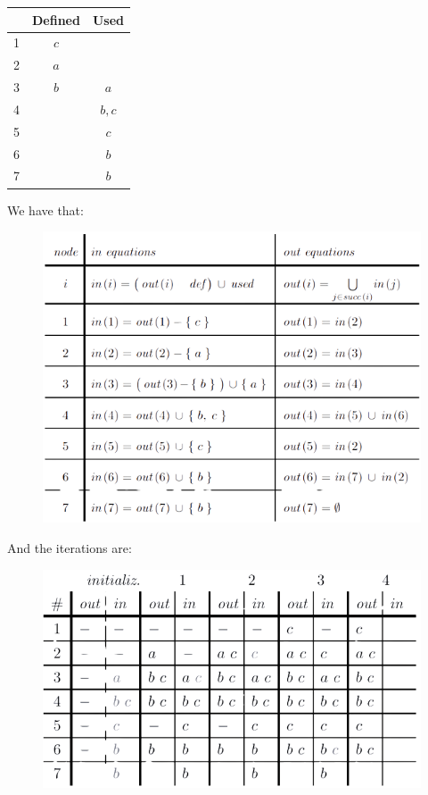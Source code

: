 \documentclass[12pt, a4paper]{report}
\begin{document}
\begin{enumerate}
\begin{table}[H]
                    \centering
                    \begin{tabular}{l|c|c|}
                    \cline{2-3}
                                            & \textbf{Defined} & \textbf{Used} \\ \hline
                    \multicolumn{1}{|l|}{1} & $c$              &               \\
                    \multicolumn{1}{|l|}{2} & $a$              &               \\
                    \multicolumn{1}{|l|}{3} & $b$              & $a$           \\
                    \multicolumn{1}{|l|}{4} &                  & $b,c$         \\
                    \multicolumn{1}{|l|}{5} &                  & $c$           \\
                    \multicolumn{1}{|l|}{6} &                  & $b$           \\
                    \multicolumn{1}{|l|}{7} &                  & $b$           \\ \hline
                    \end{tabular}
                \end{table}
                We have that: 
                \begin{figure}[H]
                    \centering
                    \includegraphics[width=0.75\linewidth]{images/dataflow.png}
                \end{figure} 
                And the iterations are: 
                \begin{figure}[H]
                    \centering
                    \includegraphics[width=0.75\linewidth]{images/dataflowit.png}

\end{figure}
\end{enumerate}
\end{document}
